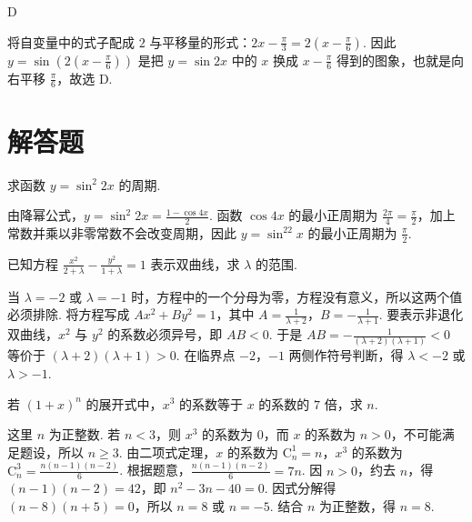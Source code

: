 \documentclass[UTF8,a4paper,oneside,11pt]{ctexbook}
\begin{document}
\begin{answer}
D
\end{answer}

\begin{solution}
将自变量中的式子配成 \(2\) 与平移量的形式：\(2x-\frac\pi3=2\left(x-\frac\pi6\right)\). 因此 \(y=\sin\left(2\left(x-\frac\pi6\right)\right)\) 是把 \(y=\sin2x\) 中的 \(x\) 换成 \(x-\frac\pi6\) 得到的图象，也就是向右平移 \(\frac\pi6\)，故选 D.
\end{solution}

\section{解答题}

\begin{problem}
求函数 \(y = \sin^2 2x\) 的周期.
\end{problem}

\begin{solution}
由降幂公式，\(y=\sin^2 2x=\frac{1-\cos4x}{2}\). 函数 \(\cos4x\) 的最小正周期为 \(\frac{2\pi}{4}=\frac\pi2\)，加上常数并乘以非零常数不会改变周期，因此 \(y=\sin^22x\) 的最小正周期为 \(\frac\pi2\).
\end{solution}

\begin{problem}
已知方程 \(\frac{x^2}{2 + \lambda} - \frac{y^2}{1 + \lambda} = 1\) 表示双曲线，求 \(\lambda\) 的范围.
\end{problem}

\begin{solution}
当 \(\lambda=-2\) 或 \(\lambda=-1\) 时，方程中的一个分母为零，方程没有意义，所以这两个值必须排除. 将方程写成 \(Ax^2+By^2=1\)，其中 \(A=\frac{1}{\lambda+2}\)，\(B=-\frac{1}{\lambda+1}\). 要表示非退化双曲线，\(x^2\) 与 \(y^2\) 的系数必须异号，即 \(AB<0\). 于是 \(AB=-\frac{1}{(\lambda+2)(\lambda+1)}<0\) 等价于 \((\lambda+2)(\lambda+1)>0\). 在临界点 \(-2\)，\(-1\) 两侧作符号判断，得 \(\lambda<-2\) 或 \(\lambda>-1\).
\end{solution}

\begin{problem}
若 \((1 + x)^n\) 的展开式中，\(x^3\) 的系数等于 \(x\) 的系数的 \(7\) 倍，求 \(n\).
\end{problem}

\begin{solution}
这里 \(n\) 为正整数. 若 \(n<3\)，则 \(x^3\) 的系数为 \(0\)，而 \(x\) 的系数为 \(n>0\)，不可能满足题设，所以 \(n\geq3\). 由二项式定理，\(x\) 的系数为 \(\mathrm C_n^1=n\)，\(x^3\) 的系数为 \(\mathrm C_n^3=\frac{n(n-1)(n-2)}6\). 根据题意，\(\frac{n(n-1)(n-2)}6=7n\). 因 \(n>0\)，约去 \(n\)，得 \((n-1)(n-2)=42\)，即 \(n^2-3n-40=0\). 因式分解得 \((n-8)(n+5)=0\)，所以 \(n=8\) 或 \(n=-5\). 结合 \(n\) 为正整数，得 \(n=8\).
\end{solution}
\end{document}
